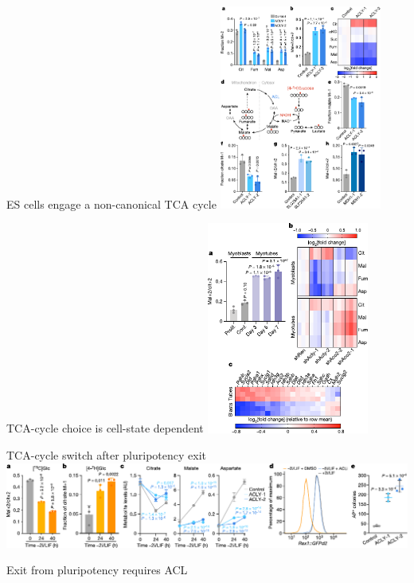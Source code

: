 \documentclass[10pt, aspectratio=169]{beamer}
\begin{document}
\begin{frame}{ES cells engage a non-canonical TCA cycle}
\includegraphics[width=0.4\textwidth]{figures/Arnold_2022_fig2.pdf}
\end{frame}

\begin{frame}{TCA-cycle choice is cell-state dependent}
\includegraphics[width=0.4\textwidth]{figures/Arnold_2022_fig3_2.pdf}
\end{frame}

\begin{frame}{TCA-cycle switch after pluripotency exit}
\includegraphics[width=\textwidth]{figures/Arnold_2022_fig4.pdf}
\end{frame}

\begin{frame}{Exit from pluripotency requires ACL}

\end{frame}
\end{document}
